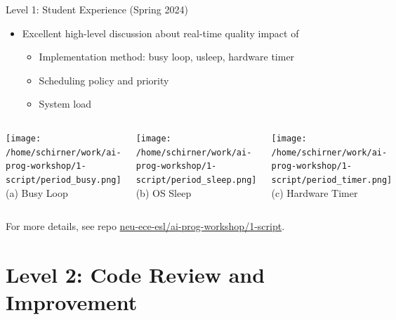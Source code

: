 \documentclass[xcolor=dvipsnames, aspectratio=169]{beamer}
\begin{document}
\begin{frame}{Level 1: Student Experience (Spring 2024)} 
    \begin{infobox}
    \begin{itemize}
        \item Excellent high-level discussion about real-time quality impact of
        \begin{itemize}
            \item Implementation method: busy loop, usleep, hardware timer
            \item Scheduling policy and priority 
            \item System load 
        \end{itemize}
    \end{itemize}
    \end{infobox}
    \begin{columns}
        \texttt{[image: /home/schirner/work/ai-prog-workshop/1-script/period\_busy.png]}
        \tiny\centering (a) Busy Loop
        
        \texttt{[image: /home/schirner/work/ai-prog-workshop/1-script/period\_sleep.png]}
        \tiny\centering (b) OS Sleep
        
        \texttt{[image: /home/schirner/work/ai-prog-workshop/1-script/period\_timer.png]}
        \tiny\centering (c) Hardware Timer
    \end{columns}
    \vspace{0.5em}
    \tiny For more details, see repo \href{https://github.com/neu-ece-esl/ai-prog-workshop/tree/main/1-script}{neu-ece-esl/ai-prog-workshop/1-script}.  
\end{frame}


\section{Level 2: Code Review and Improvement}
\end{document}
